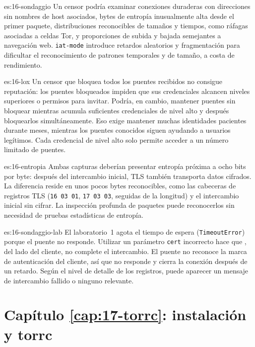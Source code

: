 \begin{soluzione}{es:16-sondaggio}
Un censor podría examinar conexiones duraderas con direcciones sin nombres de host asociados, bytes de entropía inusualmente alta desde el primer paquete, distribuciones reconocibles de tamaños y tiempos, como ráfagas asociadas a celdas Tor, y proporciones de subida y bajada semejantes a navegación web. \texttt{iat-mode} introduce retardos aleatorios y fragmentación para dificultar el reconocimiento de patrones temporales y de tamaño, a costa de rendimiento.
\end{soluzione}

\begin{soluzione}{es:16-lox}
Un censor que bloquea todos los puentes recibidos no consigue reputación: los puentes bloqueados impiden que sus credenciales alcancen niveles superiores o permisos para invitar. Podría, en cambio, mantener puentes sin bloquear mientras acumula suficientes credenciales de nivel alto y después bloquearlos simultáneamente. Eso exige mantener muchas identidades pacientes durante meses, mientras los puentes conocidos siguen ayudando a usuarios legítimos. Cada credencial de nivel alto solo permite acceder a un número limitado de puentes.
\end{soluzione}

\begin{soluzione}{es:16-entropia}
Ambas capturas deberían presentar entropía próxima a ocho bits por byte: después del intercambio inicial, TLS también transporta datos cifrados. La diferencia reside en unos pocos bytes reconocibles, como las cabeceras de registros TLS (\texttt{16 03 01}, \texttt{17 03 03}, seguidas de la longitud) y el intercambio inicial sin cifrar. La inspección profunda de paquetes puede reconocerlos sin necesidad de pruebas estadísticas de entropía.
\end{soluzione}

\begin{soluzione}{es:16-sondaggio-lab}
El laboratorio~1 agota el tiempo de espera (\texttt{TimeoutError}) porque el puente no responde. Utilizar un parámetro \texttt{cert} incorrecto hace que , del lado del cliente, no complete el intercambio. El puente no reconoce la marca de autenticación del cliente, así que no responde y cierra la conexión después de un retardo. Según el nivel de detalle de los registros, puede aparecer un mensaje de intercambio fallido o ninguno relevante.
\end{soluzione}

\section*{Capítulo \ref{cap:17-torrc}: instalación y torrc}

